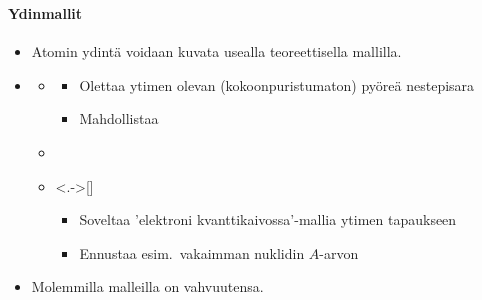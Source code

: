 \begin{frame}
\frametitle{\texorpdfstring{\culine[\sectiontitleulinecolor]{\sectiontitle}}{\sectiontitle} }
\framesubtitle{Ydinmallit}%
\appear{}

\begin{itemize}[itemsep=1.7mm]
	\item Atomin ydintä voidaan kuvata usealla teoreettisella mallilla. 
\item[] \begin{itemize}
	\item {}%
\begin{itemize}
	\item Olettaa ytimen olevan (kokoonpuristumaton) pyöreä nestepisara
\item Mahdollistaa 
\end{itemize}

\item {}
\item<.->[] \begin{itemize}
	\item Soveltaa 'elektroni kvanttikaivossa'-mallia ytimen tapaukseen
\item Ennustaa esim.\ vakaimman nuklidin $A$-arvon
\end{itemize}

\end{itemize}

\item Molemmilla malleilla on vahvuutensa.  
\end{itemize}


\endofslide 
\end{frame}

